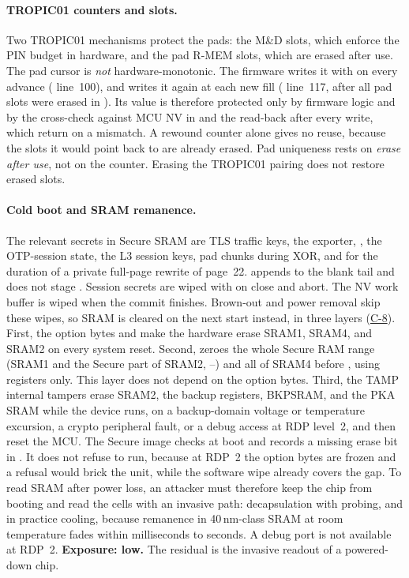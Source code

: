 \documentclass[11pt,a4paper]{article}
\begin{document}
\paragraph{TROPIC01 counters and slots.} Two TROPIC01 mechanisms protect the pads: the M\&D slots, which enforce the PIN budget in hardware, and the pad R-MEM slots, which are erased after use. The pad cursor is \emph{not} hardware-monotonic. The firmware writes it with  on every advance ( line~100), and  writes it again at each new fill ( line~117, after all pad slots were erased in ). Its value is therefore protected only by firmware logic and by the cross-check against MCU NV in  and the read-back after every write, which return  on a mismatch. A rewound counter alone gives no reuse, because the slots it would point back to are already erased. Pad uniqueness rests on \emph{erase after use}, not on the counter. Erasing the TROPIC01 pairing does not restore erased slots.

\paragraph{Cold boot and SRAM remanence.} The relevant secrets in Secure SRAM are TLS traffic keys, the exporter, , the OTP-session state, the L3 session keys, pad chunks during XOR, and  for the duration of a private full-page rewrite of page~22.  appends to the blank tail and does not stage . Session secrets are wiped with  on close and abort. The NV work buffer is wiped when the commit finishes. Brown-out and power removal skip these wipes, so SRAM is cleared on the next start instead, in three layers (\hyperref[c:C-8]{C-8}). First, the option bytes  and  make the hardware erase SRAM1, SRAM4, and SRAM2 on every system reset. Second,  zeroes the whole Secure RAM range (SRAM1 and the Secure part of SRAM2, --) and all of SRAM4 before , using registers only. This layer does not depend on the option bytes. Third, the TAMP internal tampers erase SRAM2, the backup registers, BKPSRAM, and the PKA SRAM while the device runs, on a backup-domain voltage or temperature excursion, a crypto peripheral fault, or a debug access at RDP level~2, and then reset the MCU. The Secure image checks  at boot and records a missing erase bit in . It does not refuse to run, because at RDP~2 the option bytes are frozen and a refusal would brick the unit, while the software wipe already covers the gap. To read SRAM after power loss, an attacker must therefore keep the chip from booting and read the cells with an invasive path: decapsulation with probing, and in practice cooling, because remanence in 40\,nm-class SRAM at room temperature fades within milliseconds to seconds. A debug port is not available at RDP~2. \textbf{Exposure: low.} The residual is the invasive readout of a powered-down chip.
\end{document}
